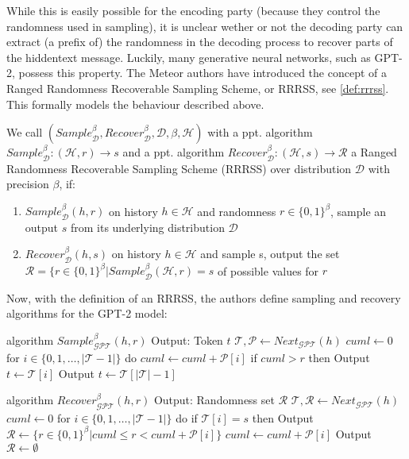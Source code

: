 While this is easily possible for the encoding party (because they control the randomness used in sampling), it is unclear wether or not the decoding party can extract (a prefix of) the randomness in the decoding process to recover parts of the hiddentext message.
Luckily, many generative neural networks, such as GPT-2, possess this property. 
The Meteor authors have introduced the concept of a Ranged Randomness Recoverable Sampling Scheme, or RRRSS, see \autoref{def:rrrss}.
This formally models the behaviour described above.

\begin{definition}
	\label{def:rrrss}
	We call 
	$(Sample_{\mathcal{D}}^\beta, Recover_{\mathcal{D}}^\beta, \mathcal{D}, \beta, \mathcal{H})$ 
	with a ppt. algorithm 
	$Sample_{\mathcal{D}}^\beta \colon (\mathcal{H}, r) \rightarrow s$ 
	and a ppt. algorithm 
	$Recover_{\mathcal{D}}^\beta \colon (\mathcal{H}, s) \rightarrow \mathcal{R}$ 
	a Ranged Randomness Recoverable Sampling Scheme (RRRSS) over distribution $\mathcal{D}$ with precision $\beta$, if:
	
	\begin{enumerate}
		\item $Sample_{\mathcal{D}}^\beta(h, r)$ on history $h \in \mathcal{H}$ and randomness $r \in \{0,1\}^\beta$, sample an output $s$ from its underlying distribution $\mathcal{D}$
		\item $Recover_{\mathcal{D}}^\beta(h, s)$ on history $h \in \mathcal{H}$ and sample s, output the set $\mathcal{R} = \{ r \in \{0,1\}^\beta | Sample_{\mathcal{D}}^\beta(\mathcal{H}, r) = s$ of possible values for $r$
	\end{enumerate}
\end{definition}

Now, with the definition of an RRRSS, the authors define sampling and recovery algorithms for the GPT-2 model:

\begin{Pseudocode}[float]
algorithm $Sample_{\mathcal{GPT}}^\beta(	h, r)$
	Output: Token $t$
	$\mathcal{T}, \mathcal{P} \leftarrow Next_{\mathcal{GPT}}(h)$
	$cuml \leftarrow 0$
	for $i \in \{ 0, 1, \dots, | \mathcal{T} - 1 | \}$ do
		$cuml \leftarrow cuml + \mathcal{P}[i]$
		if $cuml > r$ then
			Output $t \leftarrow \mathcal{T}[i]$
	Output $t \leftarrow \mathcal{T}[|\mathcal{T}|-1]$
\end{Pseudocode}

\begin{Pseudocode}[float]
algorithm $Recover_{\mathcal{GPT}}^\beta(h, r)$
	Output: Randomness set $\mathcal{R}$
	$\mathcal{T}, \mathcal{R} \leftarrow Next_{\mathcal{GPT}}(h)$
	$cuml \leftarrow 0$
	for $i \in \{ 0, 1, \dots, | \mathcal{T} - 1 | \}$ do
		if $\mathcal{T}[i] = s$ then
			Output $\mathcal{R} \leftarrow \{ r \in \{ 0, 1\}^\beta | cuml \leq r < cuml + \mathcal{P}[i] \}$
		$cuml \leftarrow cuml + \mathcal{P}[i]$
	Output $\mathcal{R} \leftarrow \emptyset$
\end{Pseudocode}

